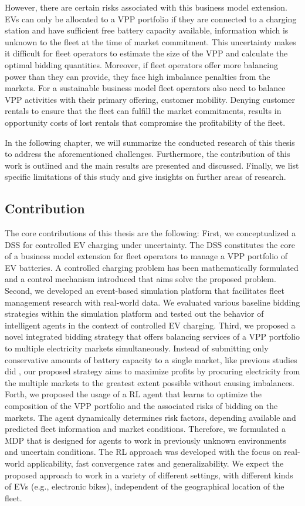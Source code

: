 \documentclass[a4paper, 12pt]{article}
\let\cite\shortcite
\begin{document}
However, there are certain risks associated  with this business model extension.
EVs can only be allocated to a VPP portfolio if they are connected to a charging
station and have sufficient free battery capacity available, information which
is unknown to the fleet at the time of market commitment. This uncertainty makes
it difficult for fleet operators to estimate the size of the VPP and calculate
the optimal bidding quantities. Moreover, if fleet operators offer more
balancing power than they can provide, they face high imbalance penalties from
the markets. For a sustainable business model fleet operators also need to
balance VPP activities with their primary offering, customer mobility. Denying
customer rentals to ensure that the fleet can fulfill the market commitments,
results in opportunity costs of lost rentals that compromise the profitability
of the fleet.

In the following chapter, we will summarize the conducted research of this
thesis to address the aforementioned challenges. Furthermore, the contribution
of this work is outlined and the main results are presented and discussed.
Finally, we list specific limitations of this study and give insights on further
areas of research.
\subsection{Contribution}
\label{sec:org407ae8b}
The core contributions of this thesis are the following: First, we
conceptualized a DSS for controlled EV charging under uncertainty. The DSS
constitutes the core of a business model extension for fleet operators to manage
a VPP portfolio of EV batteries. A controlled charging problem has been
mathematically formulated and a control mechanism introduced that aims solve the
proposed problem. Second, we developed an event-based simulation platform that
facilitates fleet management research with real-world data. We evaluated various
baseline bidding strategies within the simulation platform and tested out the
behavior of intelligent agents in the context of controlled EV charging. Third,
we proposed a novel integrated bidding strategy that offers balancing services
of a VPP portfolio to multiple electricity markets simultaneously. Instead of
submitting only conservative amounts of battery capacity to a single market,
like previous studies did
\cite{kahlen17_fleet,kahlen18_elect_vehic_virtual_power_plant_dilem}, our proposed
strategy aims to maximize profits by procuring electricity from the multiple
markets to the greatest extent possible without causing imbalances. Forth, we
proposed the usage of a RL agent that learns to optimize the composition of the
VPP portfolio and the associated risks of bidding on the markets. The agent
dynamically determines risk factors, depending available and predicted fleet
information and market conditions. Therefore, we formulated a MDP that is
designed for agents to work in previously unknown environments and uncertain
conditions. The RL approach was developed with the focus on real-world
applicability, fast convergence rates and generalizability. We expect the
proposed approach to work in a variety of different settings, with different
kinds of EVs (e.g., electronic bikes), independent of the geographical location
of the fleet.
\end{document}
